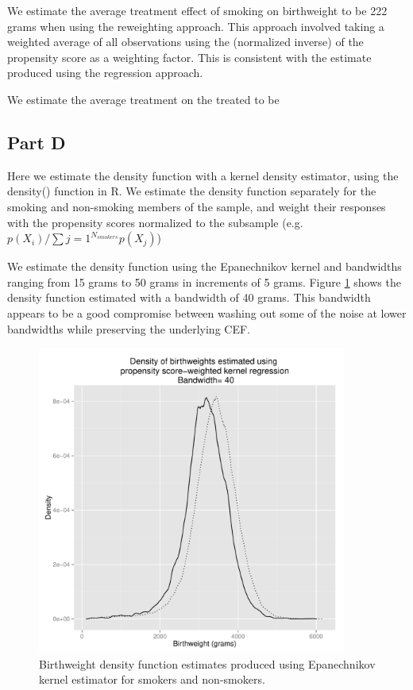 \documentclass[letterpaper, 12pt]{article}
\begin{document}
We estimate the average treatment effect of smoking on birthweight to be 222 grams when using the reweighting approach. This approach involved taking a weighted average of all observations using the (normalized inverse) of the propensity score as a weighting factor. This is consistent with the estimate produced using the regression approach.

We estimate the average treatment on the treated to be %

\subsection{Part D}
Here we estimate the density function with a kernel density estimator, using the density() function in R. We estimate the density function separately for the smoking and non-smoking members of the sample, and weight their responses with the propensity scores normalized to the subsample (e.g. $p(X_i)/\sum\limits{j=1}^{N_{smokers}}p(X_j)$)

We estimate the density function using the Epanechnikov kernel and bandwidths ranging from 15 grams to 50 grams in increments of 5 grams. Figure \ref{fig:kernel40} shows the density function estimated with a bandwidth of 40 grams. This bandwidth appears to be a good compromise between washing out some of the noise at lower bandwidths while preserving the underlying CEF.

\begin{figure}[h!]
   \centering
   \includegraphics[width=4in]{img/kerndensity40.pdf} 
   \caption{Birthweight density function estimates produced using Epanechnikov kernel estimator for smokers and non-smokers.}
   \label{fig:kernel40}
\end{figure}
\end{document}
